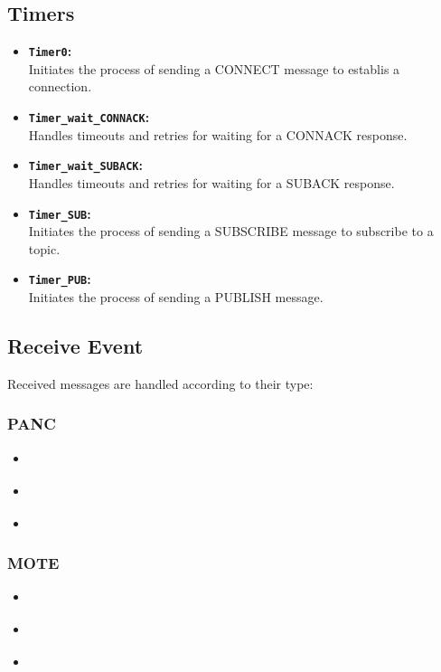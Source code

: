 \documentclass[11pt]{article}
\begin{document}
\subsection*{Timers}
\begin{itemize}
\item{\textbf{\texttt{Timer0}:}}\\
Initiates the process of sending a CONNECT message to establis a connection.
\item{\textbf{\texttt{Timer\_wait\_CONNACK}:}}\\
Handles timeouts and retries for waiting for a CONNACK response.
\item{\textbf{\texttt{Timer\_wait\_SUBACK}:}}\\
Handles timeouts and retries for waiting for a SUBACK response.
\item{\textbf{\texttt{Timer\_SUB}:}}\\
Initiates the process of sending a SUBSCRIBE message to subscribe to a topic.
\item{\textbf{\texttt{Timer\_PUB}:}}\\
Initiates the process of sending a PUBLISH message.
\end{itemize}

\subsection*{Receive Event}
Received messages are handled according to their type:
\subsubsection*{PANC}
\begin{itemize}
	\item{\textbf{}}
	\item{\textbf{}}
	\item{\textbf{}}
\end{itemize}
\subsubsection*{MOTE}
\begin{itemize}
	\item{\textbf{}}
	\item{\textbf{}}
	\item{\textbf{}}
\end{itemize}
\end{document}
